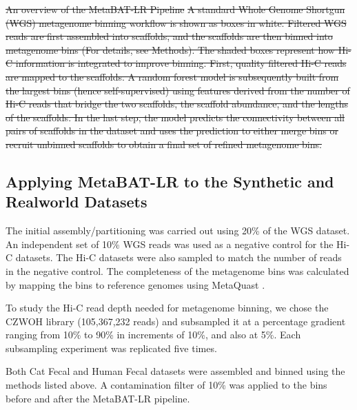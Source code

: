 \documentclass[fleqn,10pt,lineno]{wlpeerj}
\providecommand{\DIFdeltex}[1]{{\protect\color{red}\sout{#1}}}                      %
\providecommand{\DIFdelbegin}{} %
\providecommand{\DIFdelend}{} %
\providecommand{\DIFdelFL}[1]{\DIFdel{#1}} %
\providecommand{\DIFdel}[1]{\texorpdfstring{\DIFdeltex{#1}}{}} %
\newcommand{\DIFscaledelfig}{0.5}
\newlength{\DIFdelgraphicswidth} %
\newlength{\DIFdelgraphicsheight} %
\newcommand{\DIFdelincludegraphics}[2][]{%
\sbox{\DIFdelgraphicsbox}{\DIFOincludegraphics[#1]{#2}}%
\settoboxwidth{\DIFdelgraphicswidth}{\DIFdelgraphicsbox} %
\settoboxtotalheight{\DIFdelgraphicsheight}{\DIFdelgraphicsbox} %
\scalebox{\DIFscaledelfig}{%
\parbox[b]{\DIFdelgraphicswidth}{\usebox{\DIFdelgraphicsbox}\\[-\baselineskip] \rule{\DIFdelgraphicswidth}{0em}}\llap{\resizebox{\DIFdelgraphicswidth}{\DIFdelgraphicsheight}{%
\setlength{\unitlength}{\DIFdelgraphicswidth}%
\begin{picture}(1,1)%
\thicklines\linethickness{2pt} %
{\color[rgb]{1,0,0}\put(0,0){\framebox(1,1){}}}%
{\color[rgb]{1,0,0}\put(0,0){\line( 1,1){1}}}%
{\color[rgb]{1,0,0}\put(0,1){\line(1,-1){1}}}%
\end{picture}%
}\hspace*{3pt}}} %
} %
\DeclareRobustCommand{\DIFdelbegin}{\DIFOdelbegin \let\includegraphics\DIFdelincludegraphics} %
\DeclareRobustCommand{\DIFdelend}{\DIFOaddend \let\includegraphics\DIFOincludegraphics} %
\begin{document}
\DIFdelbegin %
{%
\DIFdelFL{An overview of the MetaBAT-LR Pipeline
    }%
\DIFdelFL{A standard Whole Genome Shortgun (WGS) metagenome binning workflow is shown as boxes in white. Filtered WGS reads are first assembled into scaffolds, and the scaffolds are then binned into metagenome bins (For details, see Methods). The shaded boxes represent how Hi-C information is integrated to improve binning. First, quality filtered Hi-C reads are mapped to the scaffolds. A random forest model is subsequently built from the largest bins (hence self-supervised) using features derived from the number of Hi-C reads that bridge the two scaffolds, the scaffold abundance, and the lengths of the scaffolds. In the last step, the model predicts the connectivity between all pairs of scaffolds in the dataset and uses the prediction to either merge bins or recruit unbinned scaffolds to obtain a final set of refined metagenome bins.}}

\DIFdelend \subsection*{Applying MetaBAT-LR to the Synthetic and Realworld Datasets}

The initial assembly/partitioning was carried out using 20\% of the WGS dataset. An independent set of 10\%  WGS reads was used as a negative control for the Hi-C datasets. The Hi-C datasets were also sampled to match the number of reads in the negative control. The completeness of the metagenome bins was calculated by mapping the bins to reference genomes using MetaQuast \citep{mikheenko2016metaquast}.


To study the Hi-C read depth needed for metagenome binning, we chose the CZWOH library (105,367,232 reads) and subsampled it at a percentage gradient ranging from 10\% to 90\% in increments of 10\%, and also at 5\%. Each subsampling experiment was replicated five times.      

Both Cat Fecal and Human Fecal datasets were assembled and binned using the methods listed above. A contamination filter of 10\% was applied to the bins before and after the MetaBAT-LR pipeline. 
\end{document}
